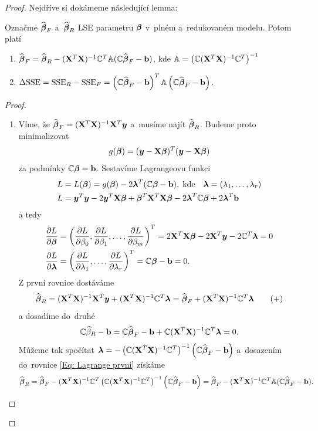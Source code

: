 \begin{proof}

\newcommand{\yb}{\boldsymbol{y}}
\newcommand{\lambdab}{\boldsymbol{\lambda}}
\newcommand{\xtx}{(\X^T \X)^{-1}}
\newcommand{\parcialni}[2]{\frac{\partial #1}{\partial #2}}

Nejdříve si dokámeme následující lemma:
\begin{lemma}
	Označme $\widehat{\boldsymbol{\beta}}_F$ a~$\widehat{\boldsymbol{\beta}}_R$ LSE parametru $\boldsymbol{\beta}$ v~plném a~redukovaném modelu. Potom platí
	\begin{enumerate}
		\item $\widehat{\boldsymbol{\beta}}_F = \widehat{\boldsymbol{\beta}}_R - (\mathbf{X}^T \mathbf{X})^{-1} \mathbb{C}^T \mathbb{A} (\mathbb{C} \widehat{\boldsymbol{\beta}}_F - \mathbf{b})$, kde $\mathbb{A} = \left(\mathbb{C} (\mathbf{X}^T \mathbf{X})^{-1} \mathbb{C}^T \right)^{-1}$
		\item $\Delta \mathrm{SSE} = \mathrm{SSE}_R - \mathrm{SSE}_F = \left(\mathbb{C} \widehat{\boldsymbol{\beta}}_F - \mathbf{b} \right)^T \mathbb{A} \left(\mathbb{C} \widehat{\boldsymbol{\beta}}_F - \mathbf{b} \right)$.
	\end{enumerate}
\end{lemma}

\begin{proof}
\begin{enumerate}
\item
Víme, že $\wbetab_F = \xtx \X^T \yb$ a~musíme najít $\widehat{\boldsymbol{\beta}}_R$. Budeme proto minimalizovat
 $$
g(\betab) = (\yb - \X \betab)^T(\yb - \X \betab)
 $$
za podmínky $\mathbb{C} \boldsymbol{\beta} = \mathbf{b}$. Sestavíme Lagrangeovu funkci
\begin{align*}
L & = L(\betab) = g(\betab) - 2 \lambdab^T(\C \betab - \bb), \; \text{kde} \quad \lambdab = (\lambda_1,\dots, \lambda_r) \\
L & = \yb^T \yb - 2 \yb^T \X \betab + \betab^T \X^T \X \betab - 2 \lambdab^T \C \betab + 2 \lambdab^T \bb
\end{align*}
a tedy
\begin{align*}
\frac{\partial L}{\partial \betab} & = \left(\parcialni{L}{\beta_0}, \parcialni{L}{\beta_1},\dots, \parcialni{L}{\beta_m} \right)^T = 2 \X^T \X \betab - 2 \X^T \yb - 2 \C^T \lambdab = 0 \\
\parcialni{L}{\lambdab} & = \left(\parcialni{L}{\lambda_1},\dots, \parcialni{L}{\lambda_r} \right)^T = \C \betab - \bb = 0.
\end{align*}
Z první rovnice dostáváme
\begin{equation}
\wbetab_R = \xtx \X^T \yb + \xtx \C^T \lambdab = \wbetab_F + \xtx \C^T \lambdab \tag{+} \label{Eq: Lagrange prvni}
\end{equation}
a dosadíme do~druhé
 $$
\C \wbeta_R - \bb = \C \wbetab_F - \bb + \C \xtx \C^T \lambdab = 0.
 $$
Můžeme tak spočítat $\lambdab = -\left(\C \xtx \C^T\right)^{-1} \left(\C \wbetab_F - \bb \right)$ a~dosazením do~rovnice \eqref{Eq: Lagrange prvni} získáme
 $$
\wbetab_R = \wbetab_F - \xtx \C^T \left(\C \xtx \C^T \right)^{-1} \left(\C \wbetab_F - \bb \right) = \wbetab_F - \xtx \C^T \Am (\C \wbetab_F - \bb).
 $$


\end{enumerate}
\end{proof}
\end{proof}
